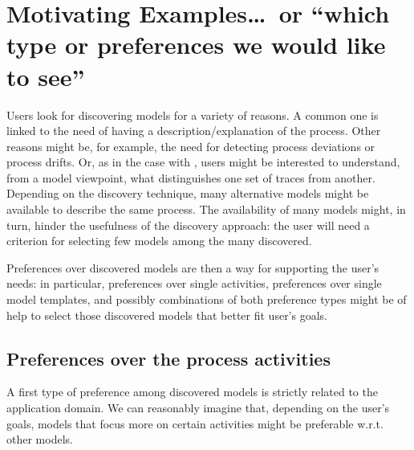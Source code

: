 
\section{Motivating Examples\ldots\ or ``which type or preferences we would like to see''}
\label{sec:example}


Users look for discovering models for a variety of reasons. A common one is linked to the need of having a description/explanation of the process. Other reasons might be, for example, the need for detecting process deviations or process drifts. Or, as in the case with \nd, users might be interested to understand, from a model viewpoint, what distinguishes one set of traces from another. Depending on the discovery technique, many alternative models might be available to describe the same process. The availability of many models might, in turn, hinder the usefulness of the discovery approach: the user will need a criterion for selecting few models among the many discovered.



Preferences over discovered models are then a way for supporting the user's needs: in particular, preferences over single activities, preferences over single model templates, and possibly combinations of both preference types might be of help to select those discovered models that better fit user's goals.



\subsection{Preferences over the process activities}
\label{subsec:prefOverActivities}

A first type of preference among discovered models is strictly related to the application domain. We can reasonably imagine that, depending on the user's goals, models that focus more on certain activities might be preferable w.r.t. other models.

